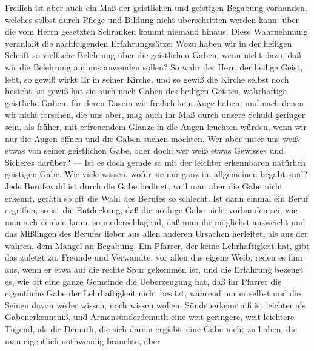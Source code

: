 Freilich ist aber auch ein Maß der geistlichen und geistigen Begabung vorhanden, welches selbst durch Pflege und Bildung nicht überschritten werden kann: über die vom Herrn gesetzten Schranken kommt niemand hinaus. Diese Wahrnehmung veranlaßt die nachfolgenden Erfahrungssätze: Wozu haben wir in der heiligen Schrift so vielfache Belehrung über die geistlichen Gaben, wenn nicht dazu, daß wir die Belehrung auf uns anwenden sollen? So wahr der Herr, der heilige Geist, lebt, so gewiß wirkt Er in seiner Kirche, und so gewiß die Kirche selbst noch besteht, so gewiß hat sie auch noch Gaben des heiligen Geistes, wahrhaftige geistliche Gaben, für
deren Dasein wir freilich kein Auge haben, und nach denen wir nicht forschen, die uns aber, mag auch ihr Maß durch unsere Schuld geringer sein, als früher, mit erfreuendem Glanze in die Augen leuchten würden, wenn wir nur die Augen öffnen und die Gaben suchen möchten. Wer aber unter uns weiß etwas von seiner geistlichen Gabe, oder doch: wer weiß etwas Gewisses und Sicheres darüber? — Ist es doch gerade so mit der leichter erkennbaren natürlich geistigen Gabe. Wie viele wissen, wofür sie nur ganz im allgemeinen begabt sind? Jede Berufswahl ist durch die Gabe bedingt; weil man aber die Gabe nicht erkennt, geräth so oft die Wahl des Berufes so schlecht. Ist dann einmal ein Beruf ergriffen, so ist die Entdeckung, daß die nöthige Gabe nicht vorhanden sei, wie man sich denken kann, so niederschlagend, daß man ihr möglichst ausweicht und das Mißlingen des Berufes lieber aus allen anderen Ursachen herleitet, als aus der wahren, dem Mangel an Begabung. Ein Pfarrer, der keine Lehrhaftigkeit hat, gibt das zuletzt zu. Freunde und Verwandte, vor allen das eigene Weib, reden es ihm aus, wenn er etwa auf die rechte Spur gekommen ist, und die Erfahrung bezeugt es, wie oft eine ganze Gemeinde die Ueberzeugung hat, daß ihr Pfarrer die eigentliche Gabe der Lehrhaftigkeit nicht besitzt, während nur er selbst und die Seinen davon weder wissen, noch wissen wollen. Sündenerkenntniß ist leichter als Gabenerkenntniß, und Armensünderdemuth eine weit geringere, weit leichtere Tugend, als die Demuth, die sich darein ergiebt, eine Gabe nicht zu haben, die man eigentlich nothwendig brauchte, aber
